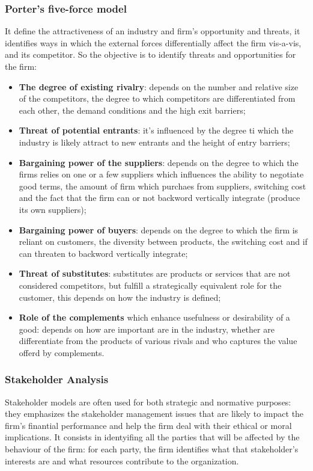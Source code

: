 \documentclass[12pt]{article}
\begin{document}
\subsubsection{Porter's five-force model}
It define the attractiveness of an industry and firm's opportunity and threats, it identifies ways in which the external forces differentially affect the firm vis-a-vis, and its competitor.
So the objective is to identify threats and opportunities for the firm:
\begin{itemize}
    \item \textbf{The degree of existing rivalry}: depends on the number and relative size of the competitors, the degree to which competitors are differentiated from each other, the demand conditions and the high exit barriers;
    \item \textbf{Threat of potential entrants}: it's influenced by the degree ti which the industry is likely attract to new entrants and the height of entry barriers;
    \item \textbf{Bargaining power of the suppliers}: depends on the degree to which the firms relies on one or a few suppliers which influences the ability to negotiate good terms, the amount of firm which purchaes from suppliers, switching cost and the fact that the firm can or not backword vertically integrate (produce its own suppliers);
    \item \textbf{Bargaining power of buyers}: depends on the degree to which the firm is reliant on customers, the diversity between products, the switching cost and if can threaten to backword vertically integrate; 
    \item \textbf{Threat of substitutes}: substitutes are products or services that are not considered competitors, but fulfill a strategically equivalent role for the customer, this depends on how the industry is defined;
    \item \textbf{Role of the complements} which enhance usefulness or desirability of a good: depends on how are important are in the industry, whether are differentiate from the products of various rivals and who captures the value offerd by complements. 
\end{itemize}
\subsubsection{Stakeholder Analysis}
Stakeholder models are often used for both strategic and normative purposes: they emphasizes the stakeholder management issues that are likely to impact the firm's finantial performance and help the firm deal with their ethical or moral implications.
It consists in identyifing all the parties that will be affected by the behaviour of the firm: for each party, the firm identifies what that stakeholder's interests are and what resources contribute to the organization.
\end{document}
